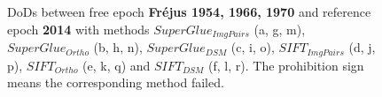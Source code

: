 \begin{figure}[htbp]
\begin{center}
		\caption{{\scriptsize \ac{DoD}s between free epoch \textbf{Fr{\'e}jus 1954, 1966, 1970} and reference epoch \textbf{2014} with methods $SuperGlue_{ImgPairs}$ (a, g, m), $SuperGlue_{Ortho}$ (b, h, n), $SuperGlue_{DSM}$ (c, i, o), $SIFT_{ImgPairs}$ (d, j, p), $SIFT_{Ortho}$ (e, k, q) and $SIFT_{DSM}$ (f, l, r). The prohibition sign means the corresponding method failed.}}
		\label{DoDFrejus}
	\end{center}
\end{figure} 



